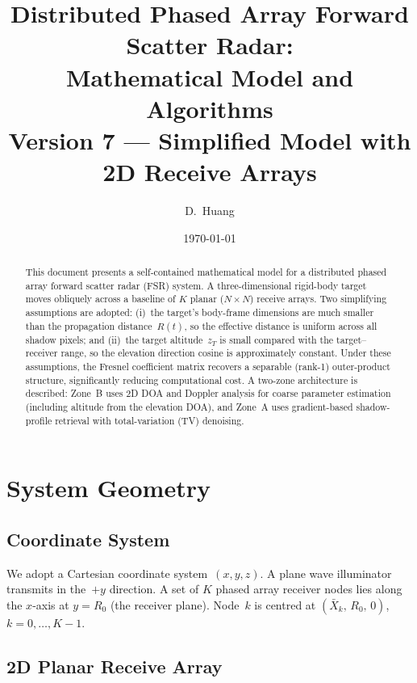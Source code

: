 \documentclass[11pt,a4paper]{article}
\title{Distributed Phased Array Forward Scatter Radar:\\
Mathematical Model and Algorithms\\[6pt]
\large Version 7 --- Simplified Model with 2D Receive Arrays}
\author{D.~Huang}
\date{\today}
\begin{document}
\maketitle

\begin{abstract}
This document presents a self-contained mathematical model for a
distributed phased array forward scatter radar (FSR) system.  A
three-dimensional rigid-body target moves obliquely across a baseline
of $K$ planar ($N\times N$) receive arrays.  Two simplifying
assumptions are adopted: (i)~the target's body-frame dimensions are
much smaller than the propagation distance~$R(t)$, so the effective
distance is uniform across all shadow pixels; and (ii)~the target
altitude~$z_T$ is small compared with the target--receiver range, so
the elevation direction cosine is approximately constant.  Under
these assumptions, the Fresnel coefficient matrix recovers a
separable (rank-1) outer-product structure, significantly reducing
computational cost.  A two-zone architecture is described: Zone~B
uses 2D DOA and Doppler analysis for coarse parameter estimation
(including altitude from the elevation DOA), and Zone~A uses
gradient-based shadow-profile retrieval with total-variation (TV)
denoising.
\end{abstract}

\tableofcontents
\newpage

\section{System Geometry}
\label{sec:geometry}

\subsection{Coordinate System}

We adopt a Cartesian coordinate system~$(x,y,z)$.  A plane wave
illuminator transmits in the~$+y$ direction.  A set of $K$ phased
array receiver nodes lies along the $x$-axis at $y=R_0$ (the
receiver plane).  Node~$k$ is centred at
$(\bar{X}_k,\,R_0,\,0)$, $k=0,\ldots,K{-}1$.

\subsection{2D Planar Receive Array}
\label{sec:2d_array}
\end{document}
